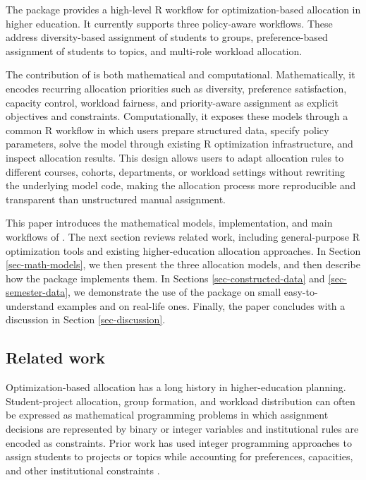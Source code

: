 The  package provides a high-level R workflow for
optimization-based allocation in higher education. It currently supports three
policy-aware workflows. These address diversity-based assignment of students to
groups, preference-based assignment of students to topics, and multi-role
workload allocation.

The contribution of  is both mathematical and computational. Mathematically,
it encodes recurring allocation priorities such as diversity, preference satisfaction,
capacity control, workload fairness, and priority-aware assignment as explicit
objectives and constraints. Computationally, it exposes these models through a
common R workflow in which users prepare structured data, specify policy parameters,
solve the model through existing R optimization infrastructure, and inspect allocation
results. This design allows users to adapt allocation rules to different courses,
cohorts, departments, or workload settings without rewriting the underlying model
code, making the allocation process more reproducible and transparent than
unstructured manual assignment.

This paper introduces the mathematical models, implementation, and main
workflows of . The next section reviews related work, including
general-purpose R optimization tools and existing higher-education allocation
approaches. In Section \ref{sec-math-models}, we then present the three
allocation models, and then describe how the package implements them. In
Sections \ref{sec-constructed-data} and \ref{sec-semester-data}, we
demonstrate the use of the package on small easy-to-understand examples and on
real-life ones. Finally, the paper concludes with a discussion in Section
\ref{sec-discussion}.

\subsection{Related work}\label{related-work}

Optimization-based allocation has a long history in higher-education planning.
Student-project allocation, group formation, and workload distribution can often
be expressed as mathematical programming problems in which assignment decisions
are represented by binary or integer variables and institutional rules are
encoded as constraints. Prior work has used integer programming approaches to
assign students to projects or topics while accounting for preferences,
capacities, and other institutional constraints
\citep{anwar2003student, meyer2009optassign, ramotsisi2022optimization}.

